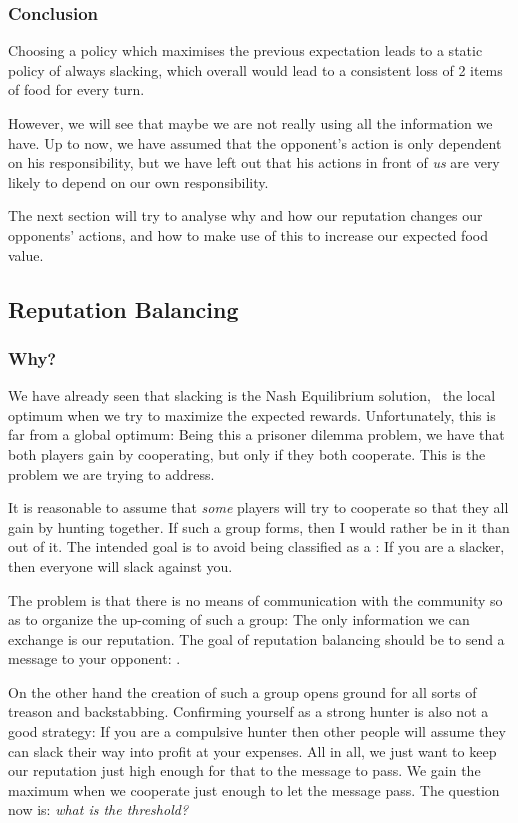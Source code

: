 \documentclass[10pt,fleqn]{article}
\begin{document}
\subsubsection{Conclusion}
Choosing a policy which maximises the previous expectation leads to a static
policy of always slacking, which overall would lead to a consistent loss of 2
items of food for every turn.

However, we will see that maybe we are not really using all the information we
have. Up to now, we have assumed that the opponent's action is only dependent on
his responsibility, but we have left out that his actions in front of \emph{us}
are very likely to depend on our own responsibility.

The next section will try to analyse why and how our reputation changes our
opponents' actions, and how to make use of this to increase our expected food
value.

\subsection{Reputation Balancing}

\subsubsection{Why?}

We have already seen that slacking is the Nash Equilibrium solution, \ie\ the
local optimum when we try to maximize the expected rewards. Unfortunately, this
is far from a global optimum: Being this a prisoner dilemma problem, we have
that both players gain by cooperating, but only if they both cooperate. This is
the problem we are trying to address.

It is reasonable to assume that \emph{some} players will try to cooperate so
that they all gain by hunting together. If such a group forms, then I would
rather be in it than out of it. The intended goal is to avoid being classified
as a : If you are a slacker, then everyone will slack against you.

The problem is that there is no means of communication with the community so as
to organize the up-coming of such a group: The only information we can exchange
is our reputation. The goal of reputation balancing should be to send a message
to your opponent: .

On the other hand the creation of such a group opens ground for all sorts of
treason and backstabbing. Confirming yourself as a strong hunter is also not a
good strategy: If you are a compulsive hunter then other people will assume they
can slack their way into profit at your expenses. All in all, we just want to
keep our reputation just high enough for that to the message to pass. We gain
the maximum when we cooperate just enough to let the message pass. The question
now is: \emph{what is the threshold?}
\end{document}

